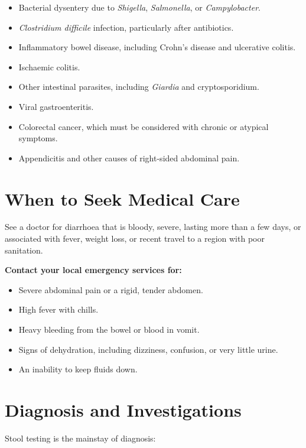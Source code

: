 \begin{itemize}
    \item Bacterial dysentery due to \textit{Shigella}, \textit{Salmonella}, or \textit{Campylobacter}.
    \item \textit{Clostridium difficile} infection, particularly after antibiotics.
    \item Inflammatory bowel disease, including Crohn's disease and ulcerative colitis.
    \item Ischaemic colitis.
    \item Other intestinal parasites, including \textit{Giardia} and cryptosporidium.
    \item Viral gastroenteritis.
    \item Colorectal cancer, which must be considered with chronic or atypical symptoms.
    \item Appendicitis and other causes of right-sided abdominal pain.
\end{itemize}

\section*{When to Seek Medical Care}
See a doctor for diarrhoea that is bloody, severe, lasting more than a few days, or associated with fever, weight loss, or recent travel to a region with poor sanitation.

\textbf{Contact your local emergency services for:}
\begin{itemize}
    \item Severe abdominal pain or a rigid, tender abdomen.
    \item High fever with chills.
    \item Heavy bleeding from the bowel or blood in vomit.
    \item Signs of dehydration, including dizziness, confusion, or very little urine.
    \item An inability to keep fluids down.
\end{itemize}

\section*{Diagnosis and Investigations}
Stool testing is the mainstay of diagnosis:

